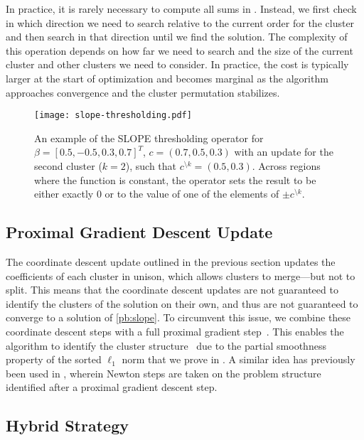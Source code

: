 In practice, it is rarely necessary to compute all sums in .
Instead, we first check in which direction we need to search relative to the current order for the cluster and then search in that direction until we find the solution.
The complexity of this operation depends on how far we need to search and the size of the current cluster and other clusters we need to consider.
In practice, the cost is typically larger at the start of optimization and becomes marginal as the algorithm approaches convergence and the cluster permutation stabilizes.

\begin{figure*}[htb]
  \centering
  \texttt{[image: slope-thresholding.pdf]}
  \caption{%
  An example of the SLOPE thresholding operator for \(\beta = [0.5, -0.5, 0.3, 0.7]^T\), \(c = (0.7, 0.5, 0.3)\)
  with an update for the second cluster (\(k = 2\)), such that
  \(c^{\setminus k} = (0.5, 0.3)\). Across regions where the function is constant,
  the operator sets the result to be either exactly 0 or to the value of one
  of the elements of \(\pm c^{\setminus k}\).
  }
  \label{fig:slope-thresholding}
\end{figure*}

\subsection{Proximal Gradient Descent Update}
\label{sec:pgd-update}

The coordinate descent update outlined in the previous section updates the
coefficients of each cluster in unison, which allows clusters to merge---but not
to split. This means that the coordinate descent updates are not guaranteed to
identify the clusters of the solution on their own, and thus are not guaranteed
to converge to a solution of \eqref{pb:slope}. To circumvent this issue, we
combine these coordinate descent steps with a full proximal gradient
step~\parencite{bogdan2015}. This enables the algorithm to identify the cluster
structure~\parencite{Liang2014} due to the partial smoothness property of the
sorted \(\ell_1\) norm that we prove in . A similar
idea has previously been used in \textcite{bareilles2022newton}, wherein Newton
steps are taken on the problem structure identified after a proximal gradient
descent step.

\subsection{Hybrid Strategy}
\label{sec:hybrid-strategy}

